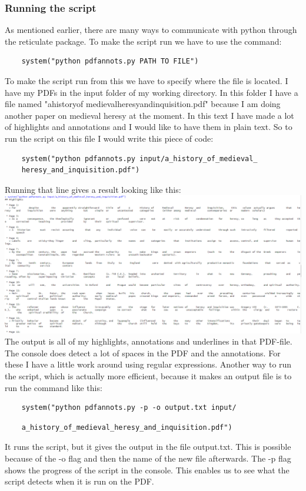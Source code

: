 \documentclass{article}
\begin{document}
\subsubsection{Running the script}
As mentioned earlier, there are many ways to communicate with python through the reticulate package. To make the script run we have to use the command:
\begin{verbatim}
    system("python pdfannots.py PATH TO FILE")
\end{verbatim}
To make the script run from this we have to specify where the file is located. I have my PDFs in the input folder of my working directory. In this folder I have a file named "a\textunderscore history\textunderscore of \textunderscore medieval\textunderscore heresy\textunderscore and\textunderscore inquisition.pdf" because I am doing another paper on medieval heresy at the moment. In this text I have made a lot of highlights and annotations  and I would like to have them in plain text. So to run the script on this file I would write this piece of code:
\begin{verbatim}
    system("python pdfannots.py input/a_history_of_medieval_
    heresy_and_inquisition.pdf")
\end{verbatim}
Running that line gives a result looking like this:\newline
\includegraphics[scale=0.5]{result_of_running_code.PNG} \newline
The output is all of my highlights, annotations and underlines in that PDF-file. The console does detect a lot of spaces in the PDF and the annotations. For these I have a little work around using regular expressions. Another way to run the script, which is actually more efficient, because it makes an output file is to run the command like this:
\begin{verbatim}
    system("python pdfannots.py -p -o output.txt input/ 
\end{verbatim} \newline
\begin{verbatim}
    a_history_of_medieval_heresy_and_inquisition.pdf")
\end{verbatim}
It runs the script, but it gives the output in the file output.txt. This is possible because of the -o flag and then the name of the new file afterwards. The -p flag shows the progress of the script in the console. This enables us to see what the script detects when it is run on the PDF.
\end{document}
